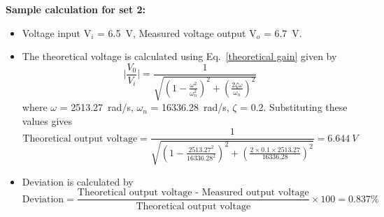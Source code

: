 \documentclass[11pt]{scrreprt}
\begin{document}
\noindent\textbf{Sample calculation for set 2:}\\

\begin{itemize}
    \item Voltage input V$_i$ = 6.5~V, Measured voltage output V$_o$ = 6.7~V.
    \item The theoretical voltage is calculated using Eq.~\ref{theoretical gain} given by
\begin{equation}
\bigg\lvert{\frac{V_0}{V_i}}\bigg\rvert = \frac{1}{\sqrt{(1-\frac{\omega^2}{\omega_n^2})^2 + (\frac{2\zeta\omega}{\omega_n})^2}}
\end{equation}
where $\omega$ = 2513.27~rad/s, $\omega_n$ = 16336.28~rad/s, $\zeta$ = 0.2. Substituting these values gives
\begin{equation}
    \text{Theoretical output voltage} = \frac{1}{\sqrt{(1-\frac{2513.27^2}{16336.28^2})^2 + (\frac{2\times0.1\times2513.27}{16336.28})^2}} = 6.644~V
\end{equation}
\item Deviation is calculated by
\begin{equation}
    \text{Deviation} = \frac{\text{Theoretical output voltage - Measured output voltage}}{\text{Theoretical output voltage}}\times 100 = 0.837\%
\end{equation}
\end{itemize}
\end{document}
